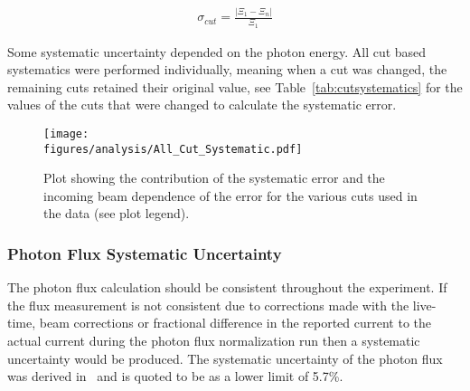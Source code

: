\begin{align}
\sigma_{cut} = \frac{\left| \Xi_1 - \Xi_n \right|}{\Xi_1}
\end{align}

Some systematic uncertainty depended on the photon energy. All cut based systematics were performed individually, meaning when a cut was changed, the remaining cuts retained their original value, see Table~\ref{tab:cutsystematics} for the values of the cuts that were changed to calculate the systematic error.


\begin{figure}[h!]\begin{center}
\texttt{[image: \\figures/analysis/All\_Cut\_Systematic.pdf]}
\caption[Plot showing the contribution of the data cut systematic error and the incoming beam dependence of the error]{\label{fig:sys_cut_error} Plot showing the contribution of the systematic error and the incoming beam dependence of the error for the various cuts used in the data (see plot legend).}
\end{center}\end{figure}
\FloatBarrier
\subsubsection{Photon Flux Systematic Uncertainty}
The photon flux calculation should be consistent throughout the experiment. If the flux measurement is not consistent due to corrections made with the live-time, beam corrections or fractional difference in the reported current to the actual current during the photon flux normalization run then a systematic uncertainty would be produced. The systematic uncertainty of the photon flux was derived in~\cite{g12note} and is quoted to be as a lower limit of 5.7\%.

